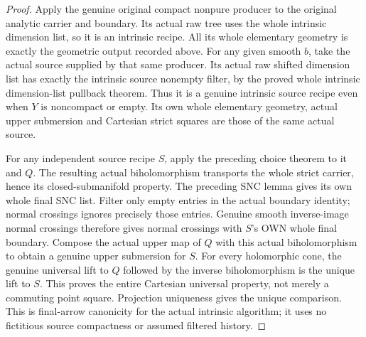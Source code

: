 \begin{proof}
Apply the genuine original compact nonpure producer to the original
analytic carrier and boundary. Its actual raw tree uses the whole
intrinsic dimension list, so it is an intrinsic recipe. All its whole
elementary geometry is exactly the geometric output recorded above.
For any given smooth $b$, take the actual source supplied by that
same producer. Its actual raw shifted dimension list has exactly
the intrinsic source nonempty filter, by the proved whole intrinsic
dimension-list pullback theorem. Thus it is a genuine intrinsic
source recipe even when $Y$ is noncompact or empty. Its own whole
elementary geometry, actual upper submersion and Cartesian strict
squares are those of the same actual source.

For any independent source recipe $S$, apply the preceding choice
theorem to it and $Q$. The resulting actual biholomorphism transports
the whole strict carrier, hence its closed-submanifold property.
The preceding SNC lemma gives its own whole final SNC list.
Filter only empty entries in the actual boundary identity; normal
crossings ignores precisely those entries. Genuine smooth inverse-image
normal crossings therefore gives normal crossings with $S$'s OWN
whole final boundary. Compose the actual upper map of $Q$ with this
actual biholomorphism to obtain a genuine upper submersion for $S$.
For every holomorphic cone, the genuine universal lift to $Q$ followed
by the inverse biholomorphism is the unique lift to $S$. This proves
the entire Cartesian universal property, not merely a commuting
point square. Projection uniqueness gives the unique comparison.
This is final-arrow canonicity for the actual intrinsic algorithm;
it uses no fictitious source compactness or assumed filtered history.
\end{proof}
